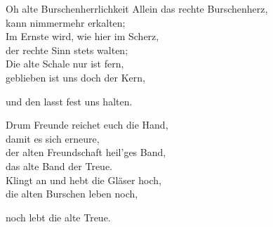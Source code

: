 \begin{song}{Oh alte Burschenherrlichkeit}
    \showversenumber
	Allein das rechte Burschenherz,\\
	kann nimmermehr erkalten;\\
	Im Ernste wird, wie hier im Scherz,\\
	der rechte Sinn stets walten;\\
	Die alte Schale nur ist fern,\\
	geblieben ist uns doch der Kern,\\
	\begin{repetition}
		und den lasst fest uns halten.
	\end{repetition}
	
    \showversenumber
	Drum Freunde reichet euch die Hand,\\
	damit es sich erneure,\\
	der alten Freundschaft heil'ges Band,\\
	das alte Band der Treue.\\
	Klingt an und hebt die Gläser hoch,\\
	die alten Burschen leben noch,\\
	\begin{repetition}
		noch lebt die alte Treue.
	\end{repetition}
	
\end{song}

